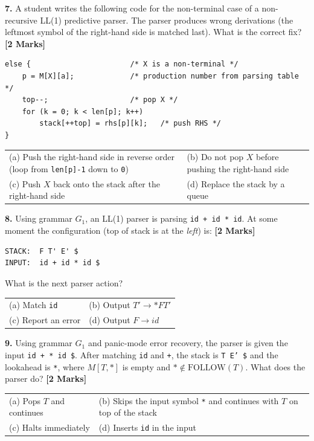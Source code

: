 \documentclass[11pt,a4paper]{article}
\begin{document}
\noindent \textbf{7.} A student writes the following code for the non-terminal case of a non-recursive LL(1) predictive parser. The parser produces wrong derivations (the leftmost symbol of the right-hand side is matched last). What is the correct fix? \hfill \textbf{[2 Marks]}
\begin{lstlisting}
else {                       /* X is a non-terminal */
    p = M[X][a];             /* production number from parsing table */
    top--;                   /* pop X */
    for (k = 0; k < len[p]; k++)
        stack[++top] = rhs[p][k];   /* push RHS */
}
\end{lstlisting}
\vspace{0.06cm}
\noindent
\begin{tabularx}{\textwidth}{@{}X X@{}}
(a) Push the right-hand side in reverse order (loop from \texttt{len[p]-1} down to \texttt{0}) & (b) Do not pop $X$ before pushing the right-hand side \\[3pt]
(c) Push $X$ back onto the stack after the right-hand side & (d) Replace the stack by a queue \\
\end{tabularx}

\vspace{0.22cm}

\noindent \textbf{8.} Using grammar $G_1$, an LL(1) parser is parsing \texttt{id + id * id}. At some moment the configuration (top of stack is at the \emph{left}) is: \hfill \textbf{[2 Marks]}
\begin{lstlisting}
STACK:  F T' E' $
INPUT:  id + id * id $
\end{lstlisting}
What is the next parser action?
\vspace{0.06cm}
\noindent
\begin{tabularx}{\textwidth}{@{}X X@{}}
(a) Match \texttt{id} & (b) Output $T' \rightarrow *FT'$ \\[3pt]
(c) Report an error & (d) Output $F \rightarrow id$ \\
\end{tabularx}

\vspace{0.22cm}

\noindent \textbf{9.} Using grammar $G_1$ and panic-mode error recovery, the parser is given the input \texttt{id + * id \$}. After matching \texttt{id} and \texttt{+}, the stack is \texttt{T E' \$} and the lookahead is \texttt{*}, where $M[T,*]$ is empty and $*\notin \text{FOLLOW}(T)$. What does the parser do? \hfill \textbf{[2 Marks]}
\vspace{0.06cm}
\noindent
\begin{tabularx}{\textwidth}{@{}X X@{}}
(a) Pops $T$ and continues & (b) Skips the input symbol \texttt{*} and continues with $T$ on top of the stack \\[3pt]
(c) Halts immediately & (d) Inserts \texttt{id} in the input \\
\end{tabularx}
\end{document}
